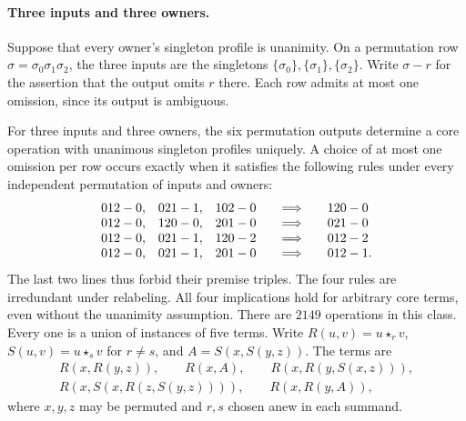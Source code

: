 \paragraph{Three inputs and three owners.}
Suppose that every owner's singleton profile is unanimity. On a
permutation row $\sigma=\sigma_0\sigma_1\sigma_2$, the three inputs
are the singletons $\{\sigma_0\},\{\sigma_1\},\{\sigma_2\}$.
Write $\sigma-r$ for the assertion that the output omits $r$ there.
Each row admits at most one omission, since its output is ambiguous.

\begin{theorem}
\label{core:thm:ternary-unanimity}
For three inputs and three owners, the six permutation outputs determine
a core operation with unanimous singleton profiles uniquely. A choice of
at most one omission per row occurs exactly when it satisfies the following
rules under every independent permutation of inputs and owners:
\begin{equation}\label{core:eq:ternary-loss-rules}
\begin{array}{c@{,\quad}c@{,\quad}c@{\qquad\Longrightarrow\qquad}l}
 012-0&021-1&102-0&120-0\\
 012-0&120-0&201-0&021-0\\
 012-0&021-1&120-2&012-2\\
 012-0&021-1&201-0&012-1 .
\end{array}
\end{equation}
The last two lines thus forbid their premise triples. The four rules
are irredundant under relabeling. All four implications hold for
arbitrary core terms, even without the unanimity assumption.
There are $2149$ operations in this class. Every one is a union of
instances of five terms. Write $R(u,v)=u\star_r v$,
$S(u,v)=u\star_s v$ for $r\ne s$, and $A=S(x,S(y,z))$. The terms are
\[
 \begin{gathered}
 R(x,R(y,z)),\qquad R(x,A),\qquad R(x,R(y,S(x,z))),\\
 R(x,S(x,R(z,S(y,z)))),\qquad R(x,R(y,A)),
 \end{gathered}
\]
where $x,y,z$ may be permuted and $r,s$ chosen anew in each summand.
\end{theorem}
